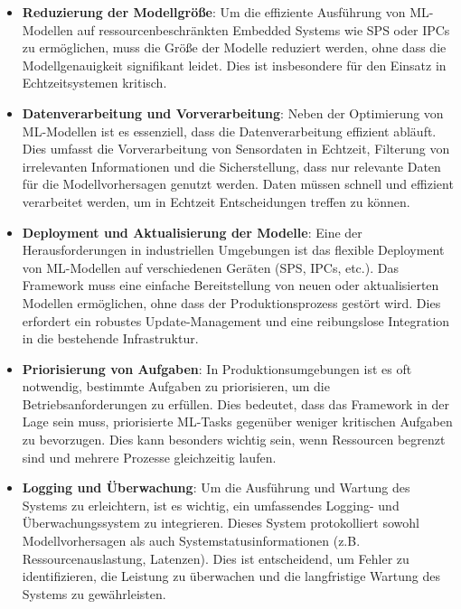 \begin{itemize}
    \item \textbf{Reduzierung der Modellgröße}: Um die effiziente Ausführung von ML-Modellen auf ressourcenbeschränkten Embedded Systems wie SPS oder IPCs zu ermöglichen, 
    muss die Größe der Modelle reduziert werden, ohne dass die Modellgenauigkeit signifikant leidet. Dies ist insbesondere für den Einsatz in Echtzeitsystemen kritisch.
    
    \item \textbf{Datenverarbeitung und Vorverarbeitung}: Neben der Optimierung von ML-Modellen ist es essenziell, dass die Datenverarbeitung effizient abläuft. 
    Dies umfasst die Vorverarbeitung von Sensordaten in Echtzeit, Filterung von irrelevanten Informationen und die Sicherstellung, dass nur relevante Daten für die 
    Modellvorhersagen genutzt werden. Daten müssen schnell und effizient verarbeitet werden, um in Echtzeit Entscheidungen treffen zu können.
    
    \item \textbf{Deployment und Aktualisierung der Modelle}: Eine der Herausforderungen in industriellen Umgebungen ist das flexible Deployment von ML-Modellen auf 
    verschiedenen Geräten (SPS, IPCs, etc.). Das Framework muss eine einfache Bereitstellung von neuen oder aktualisierten Modellen ermöglichen, ohne dass der 
    Produktionsprozess gestört wird. Dies erfordert ein robustes Update-Management und eine reibungslose Integration in die bestehende Infrastruktur.
    
    \item \textbf{Priorisierung von Aufgaben}: In Produktionsumgebungen ist es oft notwendig, bestimmte Aufgaben zu priorisieren, um die Betriebsanforderungen zu erfüllen. 
    Dies bedeutet, dass das Framework in der Lage sein muss, priorisierte ML-Tasks gegenüber weniger kritischen Aufgaben zu bevorzugen. Dies kann besonders wichtig sein, 
    wenn Ressourcen begrenzt sind und mehrere Prozesse gleichzeitig laufen.
    
    \item \textbf{Logging und Überwachung}: Um die Ausführung und Wartung des Systems zu erleichtern, ist es wichtig, ein umfassendes Logging- und Überwachungssystem zu integrieren. 
    Dieses System protokolliert sowohl Modellvorhersagen als auch Systemstatusinformationen (z.B. Ressourcenauslastung, Latenzen). Dies ist entscheidend, um Fehler zu identifizieren, 
    die Leistung zu überwachen und die langfristige Wartung des Systems zu gewährleisten.
    

\end{itemize}
